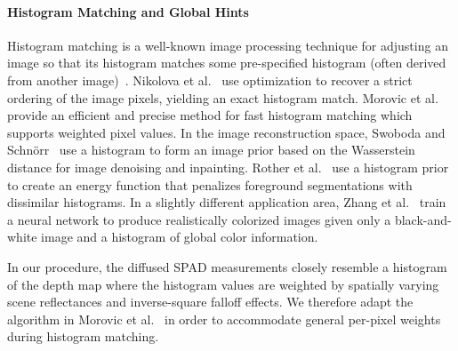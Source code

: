\paragraph{Histogram Matching and Global Hints}
%
Histogram matching is a well-known image processing technique for adjusting an image so that its histogram matches some pre-specified histogram (often derived from another image)~\cite{gonzales1977gray,Gonzalez2008}. Nikolova et al.~\cite{Nikolova2013} use optimization to recover a strict ordering of the image pixels, yielding an exact histogram match. Morovic et al.~\cite{Morovic2002} provide an efficient and precise method for fast histogram matching which supports weighted pixel values. In the image reconstruction space, Swoboda and Schn\"orr~\cite{Swoboda2013} use a histogram to form an image prior based on the Wasserstein distance for image denoising and inpainting. Rother et al.~\cite{Rother2006} use a histogram prior to create an energy function that penalizes foreground segmentations with dissimilar histograms. In a slightly different application area, Zhang et al.~\cite{Zhang2017} train a neural network to produce realistically colorized images given only a black-and-white image and a histogram of global color information.

In our procedure, the diffused SPAD measurements closely resemble a histogram of the depth map where the histogram values are weighted by spatially varying scene reflectances and inverse-square falloff effects. We therefore adapt the algorithm in Morovic et al.~\cite{Morovic2002} in order to accommodate general per-pixel weights during histogram matching.

%


